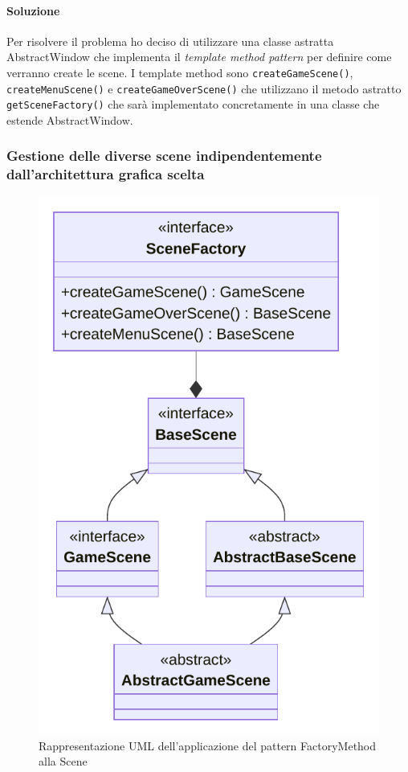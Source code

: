\documentclass[a4paper,12pt]{report}
\begin{document}
\paragraph{Soluzione} Per risolvere il problema ho deciso di utilizzare una classe astratta AbstractWindow che implementa il \textit{template method pattern} per definire come verranno create le scene. I template method sono \texttt{createGameScene()}, \texttt{createMenuScene()} e \texttt{createGameOverScene()} che utilizzano il metodo astratto \texttt{getSceneFactory()} che sarà implementato concretamente in una classe che estende AbstractWindow.

\subsubsection{Gestione delle diverse scene indipendentemente dall'architettura grafica scelta}

\begin{figure}[H]
\centering{}
\includegraphics[scale=0.75]{img/SceneUML}
\caption{Rappresentazione UML dell'applicazione del pattern FactoryMethod alla Scene}
\label{img:scene}
\end{figure}
\end{document}
